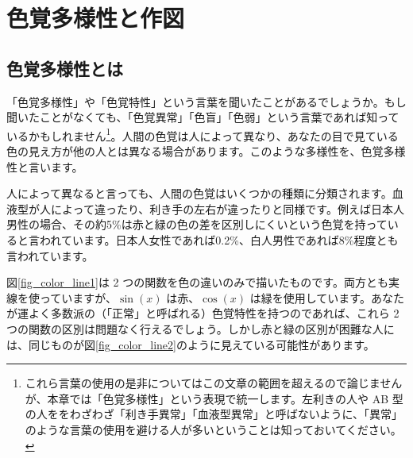 \chapter{色覚多様性と作図}
\label{chap:color}

\section{色覚多様性とは}

「色覚多様性」や「色覚特性」という言葉を聞いたことがあるでしょうか。もし聞いたことがなくても、「色覚異常」「色盲」「色弱」という言葉であれば知っているかもしれません\footnote{これら言葉の使用の是非についてはこの文章の範囲を超えるので論じませんが、本章では「色覚多様性」という表現で統一します。左利きの人や AB 型の人ををわざわざ「利き手異常」「血液型異常」と呼ばないように、「異常」のような言葉の使用を避ける人が多いということは知っておいてください。}。人間の色覚は人によって異なり、あなたの目で見ている色の見え方が他の人とは異なる場合があります。このような多様性を、色覚多様性と言います。

人によって異なると言っても、人間の色覚はいくつかの種類に分類されます。血液型が人によって違ったり、利き手の左右が違ったりと同様です。例えば日本人男性の場合、その約5\%は赤と緑の色の差を区別しにくいという色覚を持っていると言われています。日本人女性であれば0.2\%、白人男性であれば8\%程度とも言われています。

図\ref{fig_color_line1}は 2 つの関数を色の違いのみで描いたものです。両方とも実線を使っていますが、$\sin(x)$ は赤、$\cos(x)$ は緑を使用しています。あなたが運よく多数派の（「正常」と呼ばれる）色覚特性を持つのであれば、これら 2 つの関数の区別は問題なく行えるでしょう。しかし赤と緑の区別が困難な人には、同じものが図\ref{fig_color_line2}のように見えている可能性があります。


